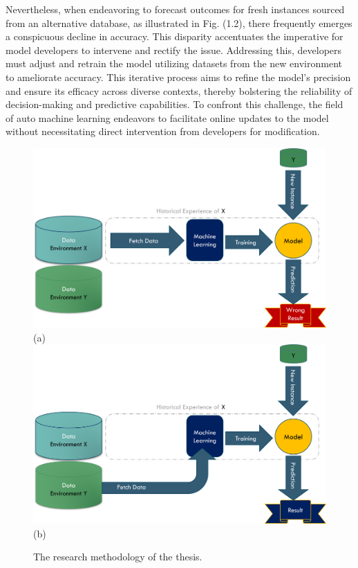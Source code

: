 Nevertheless, when endeavoring to forecast outcomes for fresh instances sourced from an alternative database, as illustrated in Fig. (1.2), there frequently emerges a conspicuous decline in accuracy. This disparity accentuates the imperative for model developers to intervene and rectify the issue. Addressing this, developers must adjust and retrain the model utilizing datasets from the new environment to ameliorate accuracy. This iterative process aims to refine the model's precision and ensure its efficacy across diverse contexts, thereby bolstering the reliability of decision-making and predictive capabilities. To confront this challenge, the field of auto machine learning endeavors to facilitate online updates to the model without necessitating direct intervention from developers for modification.

\begin{figure}[!ht]
    \centering
    \includegraphics[width=.8\textwidth]{1_introduction/figures/PNG/wrong_machine_flow_1.png}\\
    (a) \\
    \includegraphics[width=.8\textwidth]{1_introduction/figures/PNG/wrong_machine_flow_2.png}\\
    (b)
    \caption{The research methodology of the thesis.}
    \label{ch1:research-emthodo}
\end{figure}



